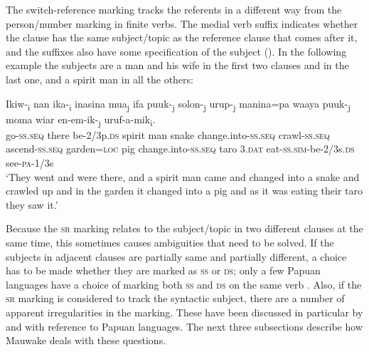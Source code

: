 The switch-reference marking tracks the referents in a different way from the person/number marking in finite verbs. The medial verb suffix indicates whether the clause has the same subject/topic as the reference clause that comes after it, and the  suffixes also have some specification of the subject (). In the following example the subjects are a man and his wife in the first two clauses and in the last one, and a spirit man in all the others:

\ea%
\label{ex:8:x1436}
\gll Ikiw-\textsubscript{i}  nan  ika-\textsubscript{i}  inasina  mua\textsubscript{j}  ifa  puuk-\textsubscript{j}  solon-\textsubscript{j}  urup-\textsubscript{j}  manina=pa  waaya puuk-\textsubscript{j}  moma  wiar  en-em-ik-\textsubscript{j} uruf-a-mik\textsubscript{i}.\\
go-\textsc{ss}.\textsc{seq} there be-2/3p.\textsc{ds} spirit  man  snake change.into-\textsc{ss}.\textsc{seq} crawl-\textsc{ss}.\textsc{seq} ascend-\textsc{ss}.\textsc{seq} garden=\textsc{loc} pig change.into-\textsc{ss}.\textsc{seq} taro 3.\textsc{dat} eat-\textsc{ss}.\textsc{sim}-be-2/3s.\textsc{ds} see-\textsc{pa}-1/3s\\
\glt`They went and were there, and a spirit man came and changed into a snake and crawled up and in the garden it changed into a pig and as it was eating their taro they saw it.'
\z


Because the \textsc{sr} marking relates to the subject/topic in two different clauses at the same time, this sometimes causes ambiguities that need to be solved. If the subjects in adjacent clauses are partially same and partially different, a choice has to be made whether they are marked as \textsc{ss} or \textsc{ds}; only a few Papuan languages have a choice of marking both \textsc{ss} and \textsc{ds} on the same verb \citep{Roberts1997}. Also, if the \textsc{sr} marking is considered to track the syntactic subject, there are a number of apparent irregularities in the marking. These have been discussed in particular by \citet{Reesink1983a} and \citet{Roberts1988b} with reference to Papuan languages. The next three subsections describe how Mauwake deals with these questions. 

